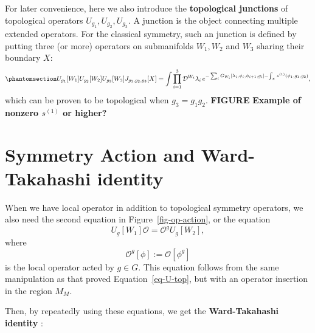 \documentclass[
  letterpaper,
  DIV=11,
  numbers=noendperiod]{scrreport}
\begin{document}
For later convenience, here we also introduce the \textbf{topological
junctions} of topological operators \(U_{g_1},U_{g_2},U_{g_3}\). A
junction is the object connecting multiple extended operators. For the
classical symmetry, such an junction is defined by putting three (or
more) operators on submanifolds \(W_1,W_2\) and \(W_3\) sharing their
boundary \(X\):
\begin{equation}\phantomsection\label{eq-junction-action}{
U_{g_1}[W_1]U_{g_2}[W_2]U_{g_3}[W_3]J_{g_1,g_2,g_3}[X] 
=
\int\prod_{i=1}^3\mathcal{D}^{W_i}\lambda_i
\, e^{-\sum_i G_{W_i}[\lambda_i,\phi_i,\phi_{i+1},g_i]-\int_X s^{(1)}(\phi_1,g_1,g_2)},
}\end{equation} which can be proven to be topological when
\(g_3=g_1g_2\). \textbf{FIGURE} \textbf{Example of nonzero \(s^{(1)}\)
or higher?}

\section{Symmetry Action and Ward-Takahashi
identity}\label{symmetry-action-and-ward-takahashi-identity}

When we have local operator in addition to topological symmetry
operators, we also need the second equation in
Figure~\ref{fig-op-action}, or the equation \[
U_g[W_1] \mathcal{O} = \mathcal{O}^g U_g[W_2],
\] where \[\mathcal{O}^g[\phi] := \mathcal{O}[\phi^g]
\] is the local operator acted by \(g \in G\). This equation follows
from the same manipulation as that proved Equation~\ref{eq-U-top}, but
with an operator insertion in the region \(M_M\).

Then, by repeatedly using these equations, we get the
\textbf{Ward-Takahashi identity} :
\end{document}
